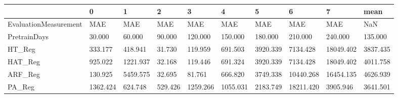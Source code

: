 \begin{tabular}{llllllllll}
\toprule
{} &        0 &        1 &       2 &        3 &        4 &        5 &         6 &         7 &     mean \\
\midrule
EvaluationMeasurement &      MAE &      MAE &     MAE &      MAE &      MAE &      MAE &       MAE &       MAE &      NaN \\
PretrainDays          &   30.000 &   60.000 &  90.000 &  120.000 &  150.000 &  180.000 &   210.000 &   240.000 &  135.000 \\
HT\_Reg                &  333.177 &  418.941 &  31.730 &  119.959 &  691.503 & 3920.339 &  7134.428 & 18049.402 & 3837.435 \\
HAT\_Reg               &  925.022 & 1221.937 &  32.168 &  119.446 &  691.324 & 3920.339 &  7134.428 & 18049.402 & 4011.758 \\
ARF\_Reg               &  130.925 & 5459.575 &  32.695 &   81.761 &  666.820 & 3749.338 & 10440.268 & 16454.135 & 4626.939 \\
PA\_Reg                & 1362.424 &  624.748 & 529.426 & 1259.266 & 1055.031 & 2183.749 & 18211.420 &  3905.946 & 3641.501 \\
\bottomrule
\end{tabular}
